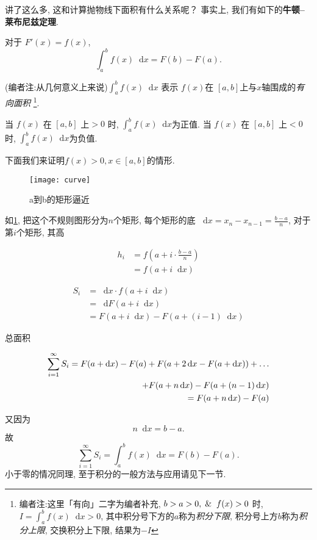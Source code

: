 \documentclass[UTF8]{mathrep}
\newcommand*{\dif}{\mathop{}\!\mathrm{d}}
\begin{document}
讲了这么多, 这和计算抛物线下面积有什么关系呢？
事实上, 我们有如下的\textbf{牛顿--莱布尼兹定理}.

\begin{theorem}[牛顿--莱布尼兹定理]
  对于 $F'(x) = f(x)$,
  \[
    \int _{a} ^{b} f(x) \dif x = F(b) - F(a)
  .\]
\end{theorem}

(编者注:从几何意义上来说)$\int _a^b f(x) \dif x$ 表示 $f(x)$在 $[a,b]$上与$x$轴围成的\emph{有向面积}
\footnote{编者注:这里「有向」二字为编者补充, $b>a>0,\And f(x)>0$ 时, $I = \int _a ^b
  f(x) \dif x >0$,
其中积分号下方的$a$称为\emph{积分下限}, 积分号上方$b$称为\emph{积分上限}, 交换积分上下限, 结果为$-I$}.

当 $f(x)$ 在 $[a,b]$ 上$>0$ 时, $\int _a ^{b} f(x) \dif x $为正值.
当 $f(x)$ 在 $[a,b]$ 上$<0$ 时, $\int _a ^{b} f(x) \dif x $为负值.

下面我们来证明$f(x)> 0,x \in [a,b]$的情形.

\begin{figure}[!htbp]
  \begin{center}
    \texttt{[image: curve]}
  \end{center}
  \caption{a到b的矩形逼近}\label{fig:absim}
\end{figure}

如\cref{fig:absim}, 把这个不规则图形分为$n$个矩形,
每个矩形的底 $\dif x = x_n - x_{n-1} =\frac{b-a}{n}$,
对于第$i$个矩形, 其高

\begin{align*}
  h_i & = f(a+ i \cdot \frac{b-a}{n}) \\
  & = f(a+ i \dif x)
\end{align*}

\begin{align*}
  S_i & = \dif x \cdot f(a+i \dif x)         \\
  & = \dif F(a+i\dif x)                  \\
  & = F(a+ i \dif x) - F(a+(i-1) \dif x)
\end{align*}

总面积

\begin{align*}
  \sum_{i=1}^{\infty} S_i  = F(a+\dif x ) - F(a) + F(a+2 \dif x -
  F(a+\dif x )) +\ldots \\
  + F(a+n\dif x) - F(a+ (n-1)\dif x)
  \notag                \\
  = F(a+n \dif x) - F(a)
\end{align*}

又因为
\[
  n\dif x = b-a
.\]
故
\[
  \sum_{i=1}^{\infty} S_i = \int _a^{b} f(x) \dif x = F(b) - F(a)
.\]
小于零的情况同理, 至于积分的一般方法与应用请见下一节.
\end{document}
